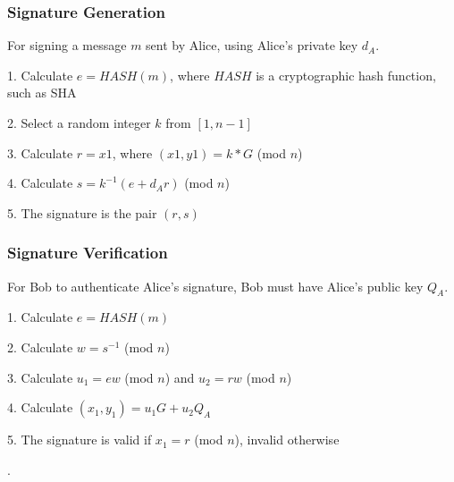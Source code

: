 \documentclass[12pt,a4paper]{article}
\begin{document}
\subsubsection{Signature Generation} \noindent \label{Signature Generation}
For signing a message $m$ sent by Alice, using Alice's private key $d_A$.

\vspace{1mm}

1. \space Calculate $e = HASH(m)$, where $HASH$ is a cryptographic hash function, such as SHA

2. \space Select a random integer $k$ from $[1,n-1]$

3. \space Calculate $r = x1$, where $(x1,y1) = k * G$ (mod $n$)

4. \space Calculate $s = k^{-1}(e+d_Ar)$ (mod $n$)

5. \space The signature is the pair $(r,s)$

\subsubsection{Signature Verification} \noindent \label{Signature Verification}
For Bob to authenticate Alice's signature, Bob must have Alice's public key $Q_A$.

\vspace{1mm}

1. \space Calculate $e = HASH(m)$

2. \space Calculate $w = s^{-1}$ (mod $n$)

3. \space Calculate $u_1 = ew$ (mod $n$) and $u_2 = rw$ (mod $n$)

4. \space Calculate $(x_1,y_1) = u_1G + u_2Q_A$

5. \space The signature is valid if $x_1 = r$ (mod $n$), invalid otherwise

\vspace{2mm}

\cite{jurivsic1997elliptic,koblitz2000state,hankerson2003guide,anoop2007elliptic,silverman2009arithmetic,brown2009standards}.

\vspace{5mm}
\end{document}
